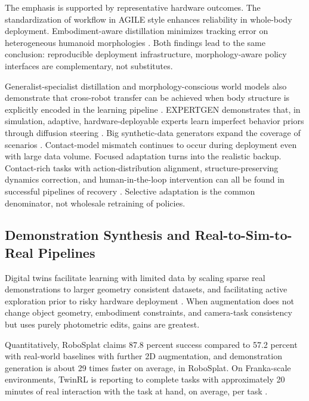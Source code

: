 \documentclass[11pt,a4paper]{article}
\begin{document}
The emphasis is supported by representative hardware outcomes. The standardization of workflow in AGILE style enhances reliability in whole-body deployment. Embodiment-aware distillation minimizes tracking error on heterogeneous humanoid morphologies \cite{zhao2026agile,peng2026eagle}. Both findings lead to the same conclusion: reproducible deployment infrastructure, morphology-aware policy interfaces are complementary, not substitutes.

Generalist-specialist distillation and morphology-conscious world models also demonstrate that cross-robot transfer can be achieved when body structure is explicitly encoded in the learning pipeline \cite{peng2026eagle,wang2026westworld}. EXPERTGEN demonstrates that, in simulation, adaptive, hardware-deployable experts learn imperfect behavior priors through diffusion steering \cite{xu2025expertgen}. Big synthetic-data generators expand the coverage of scenarios \cite{deshpande2025molmobot,choi2025scalingsim}. Contact-model mismatch continues to occur during deployment even with large data volume. Focused adaptation turns into the realistic backup. Contact-rich tasks with action-distribution alignment, structure-preserving dynamics correction, and human-in-the-loop intervention can all be found in successful pipelines of recovery \cite{hathaway2024cutting,hathaway2026neuralstyle,levy2024simdist,jiang2024transic}. Selective adaptation is the common denominator, not wholesale retraining of policies.

\subsection{Demonstration Synthesis and Real-to-Sim-to-Real Pipelines}

Digital twins facilitate learning with limited data by scaling sparse real demonstrations to larger geometry consistent datasets, and facilitating active exploration prior to risky hardware deployment \cite{yang2025robosplat,xu2025twinrl}. When augmentation does not change object geometry, embodiment constraints, and camera-task consistency but uses purely photometric edits, gains are greatest.

Quantitatively, RoboSplat claims 87.8 percent success compared to 57.2 percent with real-world baselines with further 2D augmentation, and demonstration generation is about 29 times faster on average, in RoboSplat. On Franka-scale environments, TwinRL is reporting to complete tasks with approximately 20 minutes of real interaction with the task at hand, on average, per task \cite{xu2025twinrl}.
\end{document}
